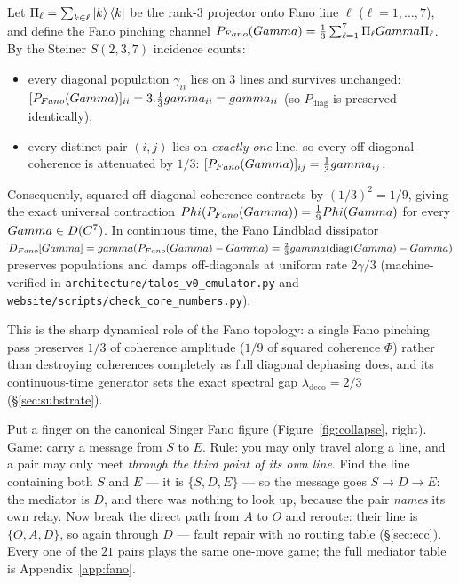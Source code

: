 \begin{claimbox}
Let $\Pi_\ell = \sum_{k\in\ell}\ket{k}\bra{k}$ be the rank-$3$ projector onto
Fano line $\ell$ ($\ell=1,\dots,7$), and define the Fano pinching channel
$P_{Fano}(Gamma) = \tfrac{1}{3}\sum_{\ell=1}^{7}\Pi_\ell Gamma\Pi_\ell$.
By the Steiner $S(2,3,7)$ incidence counts:
\begin{itemize}[leftmargin=1.4em,itemsep=1pt]
  \item every diagonal population $\gamma_{ii}$ lies on $3$ lines and survives
        unchanged: $[P_{Fano}(Gamma)]_{ii} = 3.\tfrac13gamma_{ii} = gamma_{ii}$
        (so $P_{\mathrm{diag}}$ is preserved identically);
  \item every distinct pair $(i,j)$ lies on \emph{exactly one} line, so every
        off-diagonal coherence is attenuated by $1/3$:
        $[P_{Fano}(Gamma)]_{ij} = \tfrac13gamma_{ij}$.
\end{itemize}
Consequently, squared off-diagonal coherence contracts by $(1/3)^2 = 1/9$,
giving the exact universal contraction
$Phi(P_{Fano}(Gamma)) = \tfrac{1}{9}Phi(Gamma)$ for every
$Gamma\in D(C^7)$. In continuous time, the Fano Lindblad dissipator
$D_{Fano}[Gamma]=gamma(P_{Fano}(Gamma)-Gamma)
=\tfrac{2}{3}gamma(\operatorname{diag}(Gamma)-Gamma)$ preserves populations and
damps off-diagonals at uniform rate $2\gamma/3$ (machine-verified in
\texttt{architecture/talos\_v0\_emulator.py} and
\texttt{website/scripts/check\_core\_numbers.py}).
\end{claimbox}

This is the sharp dynamical role of the Fano topology: a single Fano pinching
pass preserves $1/3$ of coherence amplitude ($1/9$ of squared coherence $\Phi$)
rather than destroying coherences completely as full diagonal dephasing does,
and its continuous-time generator sets the exact spectral gap
$\lambda_{\mathrm{deco}}=2/3$ (\S\ref{sec:substrate}).

\begin{trybox}
Put a finger on the canonical Singer Fano figure (Figure~\ref{fig:collapse}, right).
Game: carry a message from $S$ to $E$. Rule: you may only travel along a line,
and a pair may only meet \emph{through the third point of its own line}. Find
the line containing both $S$ and $E$ --- it is $\{S,D,E\}$ --- so the message
goes $S\to D\to E$: the mediator is $D$, and there was nothing to look up,
because the pair \emph{names} its own relay. Now break the direct path from
$A$ to $O$ and reroute: their line is $\{O,A,D\}$, so again through $D$ ---
fault repair with no routing table (\S\ref{sec:ecc}). Every one of the $21$
pairs plays the same one-move game; the full mediator table is
Appendix~\ref{app:fano}.
\end{trybox}

